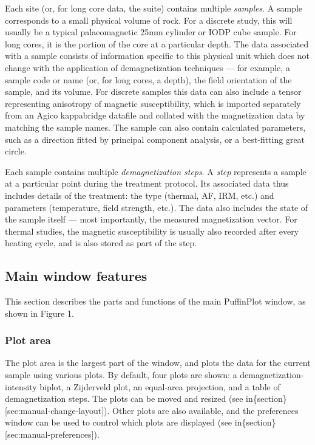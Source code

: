 \documentclass[a4paper]{article}
\begin{document}
Each site (or, for long core data, the suite) contains multiple
\emph{samples}. A sample corresponds to a small physical volume of rock.
For a discrete study, this will usually be a typical palaeomagnetic 25mm
cylinder or IODP cube sample. For long cores, it is the portion of the
core at a particular depth. The data associated with a sample consists
of information specific to this physical unit which does not change with
the application of demagnetization techniques --- for example, a sample
code or name (or, for long cores, a depth), the field orientation of the
sample, and its volume. For discrete samples this data can also include
a tensor representing anisotropy of magnetic susceptibility, which is
imported separately from an Agico kappabridge datafile and collated with
the magnetization data by matching the sample names. The sample can also
contain calculated parameters, such as a direction fitted by principal
component analysis, or a best-fitting great circle.

Each sample contains multiple \emph{demagnetization steps}. A
\emph{step} represents a sample at a particular point during the
treatment protocol. Its associated data thus includes details of the
treatment: the type (thermal, AF, IRM, etc.) and parameters
(temperature, field strength, etc.). The data also includes the state of
the sample itself --- most importantly, the measured magnetization
vector. For thermal studies, the magnetic susceptibility is usually also
recorded after every heating cycle, and is also stored as part of the
step.

\subsection{Main window features}

This section describes the parts and functions of the main PuffinPlot
window, as shown in Figure 1.

\subsubsection{Plot area}

The plot area is the largest part of the window, and plots the data for
the current sample using various plots. By default, four plots are
shown: a demagnetization-intensity biplot, a Zijderveld plot, an
equal-area projection, and a table of demagnetization steps. The plots
can be moved and resized (see
in\{section\}{[}sec:manual-change-layout{]}). Other plots are also
available, and the preferences window can be used to control which plots
are displayed (see in\{section\}{[}sec:manual-preferences{]}).
\end{document}
